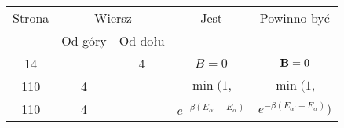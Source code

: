 \documentclass[a4paper,11pt]{article}
\numberwithin{equation}{section}
\begin{document}
\newpage



\begin{center}

  \begin{tabular}{|c|c|c|c|c|}
    \hline
    Strona & \multicolumn{2}{c|}{Wiersz} & Jest
                              & Powinno być \\ \cline{2-3}
    & Od góry & Od dołu & & \\
    \hline
    \hphantom{0}14 & & \hphantom{0}4 & $B = 0$ & $\mathbf{B} = 0$ \\
    110 & \hphantom{0}4 & & $\min( 1,$ & $\min\!\Big( 1,$ \\
    110 & \hphantom{0}4 & & $e^{ -\beta ( E_{ \alpha' } - E_{ \alpha } ) }$
    & $e^{ -\beta ( E_{ \alpha' } - E_{ \alpha } ) } \Big)$ \\
    \hline
  \end{tabular}

\end{center}

\VerSpaceTwo



























\end{document}
